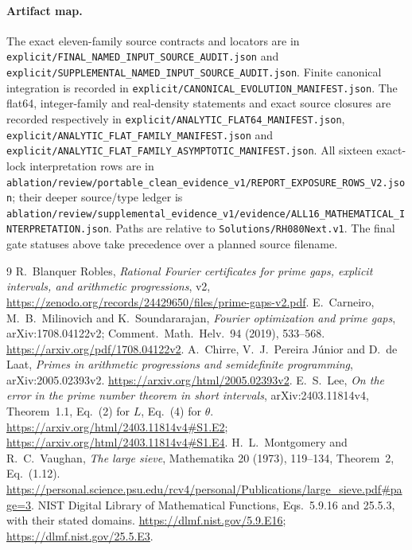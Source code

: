 \documentclass[11pt]{article}
\begin{document}
\paragraph{Artifact map.}
\begingroup\raggedright
The exact eleven-family source contracts and locators are in
\nolinkurl{explicit/FINAL_NAMED_INPUT_SOURCE_AUDIT.json} and
\nolinkurl{explicit/SUPPLEMENTAL_NAMED_INPUT_SOURCE_AUDIT.json}.
Finite canonical integration is recorded in
\nolinkurl{explicit/CANONICAL_EVOLUTION_MANIFEST.json}.
The flat64, integer-family and real-density statements and exact source
closures are recorded respectively in
\nolinkurl{explicit/ANALYTIC_FLAT64_MANIFEST.json},
\nolinkurl{explicit/ANALYTIC_FLAT_FAMILY_MANIFEST.json} and
\nolinkurl{explicit/ANALYTIC_FLAT_FAMILY_ASYMPTOTIC_MANIFEST.json}.
All sixteen exact-lock interpretation rows are in
\nolinkurl{ablation/review/portable_clean_evidence_v1/REPORT_EXPOSURE_ROWS_V2.json};
their deeper source/type ledger is
\nolinkurl{ablation/review/supplemental_evidence_v1/evidence/ALL16_MATHEMATICAL_INTERPRETATION.json}.
Paths are relative to \nolinkurl{Solutions/RH080Next.v1}.
The final gate statuses above take precedence over a planned source filename.
\par\endgroup

\begin{thebibliography}{9}
R.~Blanquer Robles, \emph{Rational Fourier certificates for prime gaps,
explicit intervals, and arithmetic progressions}, v2,
\url{https://zenodo.org/records/24429650/files/prime-gaps-v2.pdf}.
E.~Carneiro, M.~B.~Milinovich and K.~Soundararajan,
\emph{Fourier optimization and prime gaps}, arXiv:1708.04122v2;
Comment.\ Math.\ Helv.\ 94 (2019), 533--568.
\url{https://arxiv.org/pdf/1708.04122v2}.
A.~Chirre, V.~J.~Pereira J\'unior and D.~de Laat,
\emph{Primes in arithmetic progressions and semidefinite programming},
arXiv:2005.02393v2.
\url{https://arxiv.org/html/2005.02393v2}.
E.~S.~Lee, \emph{On the error in the prime number theorem in short intervals},
arXiv:2403.11814v4, Theorem~1.1, Eq.~(2) for \(L\), Eq.~(4) for \(\theta\).
\url{https://arxiv.org/html/2403.11814v4#S1.E2};
\url{https://arxiv.org/html/2403.11814v4#S1.E4}.
H.~L.~Montgomery and R.~C.~Vaughan, \emph{The large sieve},
Mathematika 20 (1973), 119--134, Theorem~2, Eq.~(1.12).
\url{https://personal.science.psu.edu/rcv4/personal/Publications/large_sieve.pdf#page=3}.
NIST Digital Library of Mathematical Functions, Eqs.~5.9.16 and 25.5.3,
with their stated domains.
\url{https://dlmf.nist.gov/5.9.E16};
\url{https://dlmf.nist.gov/25.5.E3}.
\end{thebibliography}
\end{document}
